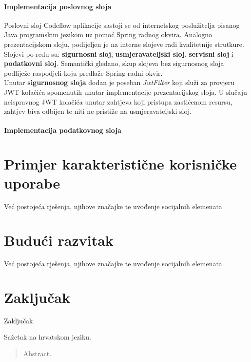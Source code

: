\documentclass[times, utf8, zavrsni]{fer}
\begin{document}
	 		\subsubsection{Implementacija poslovnog sloja}
	 		Poslovni sloj Codeflow aplikacije sastoji se od internetskog poslužitelja pisanog Java programskim jezikom uz pomoć Spring radnog okvira. Analogno prezentacijskom sloju, podijeljen je na interne slojeve radi kvalitetnije strutkure. Slojevi po redu su: \textbf{sigurnosni sloj}, \textbf{usmjeravateljski sloj}, \textbf{servisni sloj} i \textbf{podatkovni sloj}. Semantički gledano, skup slojeva bez sigurnosnog sloja podliježe raspodjeli koju predlaže Spring radni okvir.\\
	 		Unutar \textbf{sigurnosnog sloja} dodan je poseban \textit{JwtFilter} koji služi za provjeru JWT kolačića spomenutih unutar implementacije prezentacijskog sloja. U slučaju neispravnog JWT kolačića unutar zahtjeva koji pristupa zastićenom resursu, zahtjev biva odbijen te niti ne pristiže na usmjeravateljski sloj.
			
			\subsubsection{Implementacija podatkovnog sloja}
	
	\chapter{Primjer karakteristične korisničke uporabe}
	Već postojeća rješenja, njihove značajke te uvođenje socijalnih elemenata
	
	\chapter{Budući razvitak}
	Već postojeća rješenja, njihove značajke te uvođenje socijalnih elemenata
	
	\chapter{Zaključak}
	Zaključak.
	
	\nocite{react2021}
	\nocite{react-router2021}
	\nocite{bootstrap2021}
	\nocite{materialUI2021}
	\nocite{ace2021}
	\nocite{spring2021}
	\nocite{hibernate2021}
	\nocite{springsecurity2021}
	\nocite{springdatajpa2021}
	\nocite{axios2021}
	\nocite{git2021}
	\nocite{postgresql2021}
	
	
	
	\begin{sazetak}
		Sažetak na hrvatskom jeziku.
		
	\end{sazetak}
	
	\begin{abstract}
		Abstract.
		
	\end{abstract}
	
\end{document}
